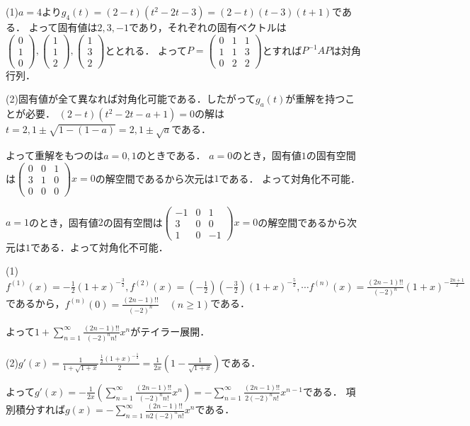 \documentclass[
		book,
		head_space=20mm,
		foot_space=20mm,
		gutter=10mm,
		line_length=190mm
]{jlreq}
\begin{document}
(1)$a=4$より$g_4(t)=(2-t)(t^2-2t-3)=(2-t)(t-3)(t+1)$である．
よって固有値は$2,3,-1$であり，それぞれの固有ベクトルは$\begin{pmatrix}
0\\1\\0
\end{pmatrix},\begin{pmatrix}
1\\1\\2
\end{pmatrix},\begin{pmatrix}
1\\3\\2
\end{pmatrix}$ととれる．
よって$P=\begin{pmatrix}
0&1&1\\
1&1&3\\
0&2&2
\end{pmatrix}$とすれば$P^{-1}AP$は対角行列．

(2)固有値が全て異なれば対角化可能である．したがって$g_a(t)$が重解を持つことが必要．
$(2-t)(t^2-2t-a+1)=0$の解は$t=2,1\pm\sqrt{1-(1-a)}=2,1\pm\sqrt{a}$である．

よって重解をもつのは$a=0,1$のときである．
$a=0$のとき，固有値$1$の固有空間は$\begin{pmatrix}
0&0&1\\
3&1&0\\
0&0&0
\end{pmatrix}x=0$の解空間であるから次元は$1$である．
よって対角化不可能．

$a=1$のとき，固有値$2$の固有空間は$\begin{pmatrix}
-1 & 0 & 1\\
3 & 0 & 0\\
1 & 0 & -1
\end{pmatrix}x=0$の解空間であるから次元は$1$である．よって対角化不可能．

(1)$f^{(1)}(x)=-\frac{1}{2}(1+x)^{-\frac{3}{2}},f^{(2)}(x)=(-\frac{1}{2})(-\frac{3}{2})(1+x)^{-\frac{5}{2}},\cdots f^{(n)}(x)=\frac{(2n-1)!!}{(-2)^n}(1+x)^{-\frac{2n+1}{2}}
$であるから，$f^{(n)}(0)=\frac{(2n-1)!!}{(-2)^n}\quad(n\ge 1)$である．

よって$1+\sum\limits_{n=1}^\infty \frac{(2n-1)!!}{(-2)^n n!}x^n$がテイラー展開．

(2)$g'(x)=\frac{1}{1+\sqrt{1+x}}\frac{\frac{1}{2}(1+x)^{-\frac{1}{2}}}{2}=\frac{1}{2x}(1-\frac{1}{\sqrt{1+x}})$である．

よって$g'(x)=-\frac{1}{2x}(\sum\limits_{n=1}^\infty \frac{(2n-1)!!}{(-2)^n n!}x^n)=-\sum\limits_{n=1}^\infty \frac{(2n-1)!!}{2(-2)^n n!}x^{n-1}$である．
項別積分すれば$g(x)=-\sum\limits_{n=1}^\infty \frac{(2n-1)!!}{n2(-2)^n n!}x^{n}$である．
\end{document}
